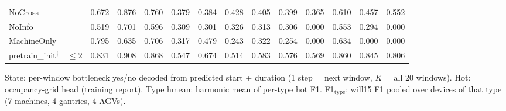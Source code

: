 \documentclass[9pt,a4paper,twocolumn]{extarticle}
\begin{document}
\begin{table}[tp]
\begin{tabular}{llrrrrrrrrrrrr}
NoCross &  & 0.672 & 0.876 & 0.760 & 0.379 & 0.384 & 0.428 & 0.405 & 0.399 & 0.365 & 0.610 & 0.457 & 0.552 \\
NoInfo &  & 0.519 & 0.701 & 0.596 & 0.309 & 0.301 & 0.326 & 0.313 & 0.306 & 0.000 & 0.553 & 0.294 & 0.000 \\
MachineOnly &  & 0.795 & 0.635 & 0.706 & 0.317 & 0.479 & 0.243 & 0.322 & 0.254 & 0.000 & 0.634 & 0.000 & 0.000 \\
\midrule
pretrain\_init$^\dagger$ & $\le 2$ & 0.831 & 0.908 & 0.868 & 0.547 & 0.674 & 0.514 & 0.583 & 0.576 & 0.569 & 0.860 & 0.845 & 0.806 \\
\bottomrule
\end{tabular}
\par\smallskip\parbox{\textwidth}{\scriptsize State: per-window bottleneck yes/no decoded from predicted start + duration (1 step = next window, $K$ = all 20 windows). Hot: occupancy-grid head (training report). Type hmean: harmonic mean of per-type hot F1. F1$_{\mathrm{type}}$: will15 F1 pooled over devices of that type (7 machines, 4 gantries, 4 AGVs).}
\end{table}
\end{document}
